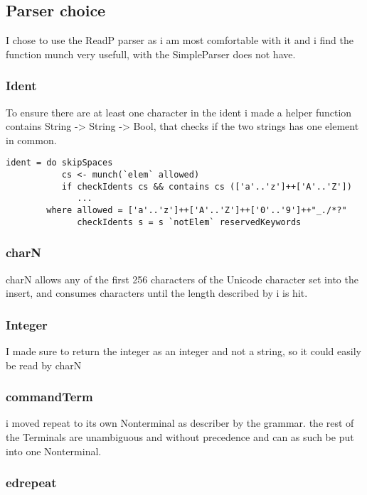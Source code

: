 \documentclass{article}
\begin{document}
\subsection{Parser choice}

I chose to use the ReadP parser as i am most comfortable with it
and i find the function munch very usefull, with the SimpleParser
does not have.  

\subsubsection{Ident}

To ensure there are at least one character in the ident i 
made a helper function contains String -> String -> Bool,
that checks if the two strings has one element in common.
\begin{verbatim}
ident = do skipSpaces
           cs <- munch(`elem` allowed)  
           if checkIdents cs && contains cs (['a'..'z']++['A'..'Z'])
              ...
        where allowed = ['a'..'z']++['A'..'Z']++['0'..'9']++"_./*?"
              checkIdents s = s `notElem` reservedKeywords 
\end{verbatim}
\subsubsection{charN}

charN allows any of the first 256 characters of the 
Unicode character set into the insert, and consumes 
characters until the length described by i is hit. 

\subsubsection{Integer}

I made sure to return the integer as an integer and not
a string, so it could easily be read by charN

\subsubsection{commandTerm}

i moved repeat to its own Nonterminal as describer by the grammar.
the rest of the Terminals are unambiguous and without precedence
and can as such be put into one Nonterminal. 

\subsubsection{edrepeat}
\end{document}
